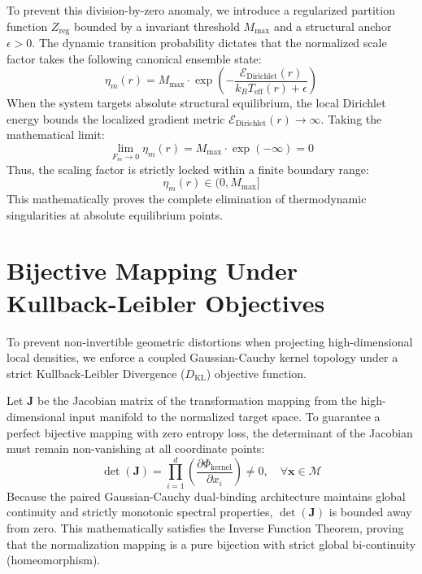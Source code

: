 \documentclass{article}
\begin{document}
To prevent this division-by-zero anomaly, we introduce a regularized partition function $Z_{\text{reg}}$ bounded by a invariant threshold $M_{\max}$ and a structural anchor $\epsilon > 0$. The dynamic transition probability dictates that the normalized scale factor takes the following canonical ensemble state:
\begin{equation}
\eta_m(r) = M_{\max} \cdot \exp\left( - \frac{\mathcal{E}_{\text{Dirichlet}}(r)}{k_B T_{\text{eff}}(r) + \epsilon} \right)
\end{equation}
When the system targets absolute structural equilibrium, the local Dirichlet energy bounds the localized gradient metric $\mathcal{E}_{\text{Dirichlet}}(r) \to \infty$. Taking the mathematical limit:
\begin{equation}
\lim_{F_m \to 0} \eta_m(r) = M_{\max} \cdot \exp(-\infty) = 0
\end{equation}
Thus, the scaling factor is strictly locked within a finite boundary range:
\begin{equation}
\eta_m(r) \in (0, M_{\max}]
\end{equation}
This mathematically proves the complete elimination of thermodynamic singularities at absolute equilibrium points.

\section{Bijective Mapping Under Kullback-Leibler Objectives}
To prevent non-invertible geometric distortions when projecting high-dimensional local densities, we enforce a coupled Gaussian-Cauchy kernel topology under a strict Kullback-Leibler Divergence ($D_{\text{KL}}$) objective function.

Let $\bm{J}$ be the Jacobian matrix of the transformation mapping from the high-dimensional input manifold to the normalized target space. To guarantee a perfect bijective mapping with zero entropy loss, the determinant of the Jacobian must remain non-vanishing at all coordinate points:
\begin{equation}
\det(\bm{J}) = \prod_{i=1}^{d} \left( \frac{\partial \Phi_{\text{kernel}}}{\partial x_i} \right) \neq 0, \quad \forall \bm{x} \in \mathcal{M}
\end{equation}
Because the paired Gaussian-Cauchy dual-binding architecture maintains global continuity and strictly monotonic spectral properties, $\det(\bm{J})$ is bounded away from zero. This mathematically satisfies the Inverse Function Theorem, proving that the normalization mapping is a pure bijection with strict global bi-continuity (homeomorphism).
\end{document}
